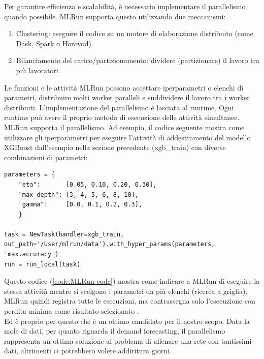 \documentclass[12pt,a4paper]{report}
\begin{document}
Per garantire efficienza e scalabilità, è necessario implementare il parallelismo quando possibile. MLRun supporta questo utilizzando due meccanismi: \cite{MLRun}

\begin{enumerate}
    \item Clustering: eseguire il codice su un motore di elaborazione distribuito (come Dask, Spark o Horovod).
    \item Bilanciamento del carico/partizionamento: dividere (partizionare) il lavoro tra più lavoratori.
\end{enumerate}

Le funzioni e le attività MLRun possono accettare iperparametri o elenchi di parametri, distribuire molti worker paralleli e suddividere il lavoro tra i worker distribuiti. L'implementazione del parallelismo è lasciata al runtime. Ogni runtime può avere il proprio metodo di esecuzione delle attività simultanee.\\
MLRun supporta il parallelismo. Ad esempio, il codice seguente mostra come utilizzare gli iperparametri per eseguire l'attività di addestramento del modello XGBoost dall'esempio nella sezione precedente (xgb\_train) con diverse combinazioni di parametri:
\\
\begin{lstlisting}[caption={Esempio di codice},captionpos=b, label={code:MLRun-code}]
parameters = {
    "eta":       [0.05, 0.10, 0.20, 0.30],
    "max_depth": [3, 4, 5, 6, 8, 10],
    "gamma":     [0.0, 0.1, 0.2, 0.3],
    }

task = NewTask(handler=xgb_train, out_path='/User/mlrun/data').with_hyper_params(parameters, 'max.accuracy')
run = run_local(task)
\end{lstlisting}

Questo codice (\ref{code:MLRun-code}) mostra come indicare a MLRun di eseguire la stessa attività mentre si scelgono i parametri da più elenchi (ricerca a griglia). MLRun quindi registra tutte le esecuzioni, ma contrassegna solo l'esecuzione con perdita minima come risultato selezionato \cite{MLRun}.
\\
Ed è proprio per questo che è un ottimo candidato per il nostro scopo. Data la mole di dati, per quanto riguarda il demand forecasting, il parallelismo rappresenta un ottima soluzione al problema di allenare una rete con tantissimi dati, altrimenti ci potrebbero volere addiritura giorni.
\newpage
\end{document}
